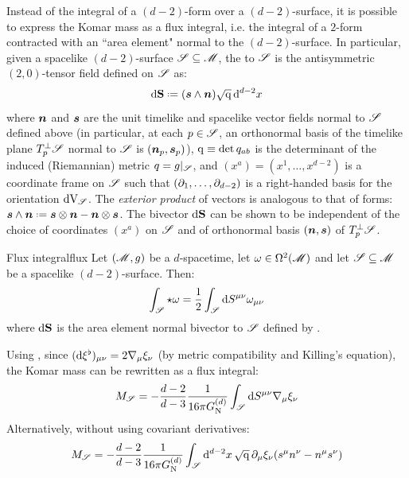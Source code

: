Instead of the integral of a $ (d-2) $-form over a $ (d-2) $-surface, it is possible to express the Komar mass as a flux integral, i.e. the integral of a $ 2 $-form contracted with an ``area element" normal to the $ (d-2) $-surface. In particular, given a spacelike $ (d-2) $-surface $ \mathscr{S} \subseteq \mathscr{M} $, the  to $ \mathscr{S} $ is the antisymmetric $ (2,0) $-tensor field defined on $ \mathscr{S} $ as:
\begin{equation}
  \dd \ve{S} \defeq (\ssb \wedge \nb) \sqrt{\mt{q}} \, \dd^{d-2} x
  \label{eq:area-element}
\end{equation}
where $ \boldsymbol{n} $ and $ \boldsymbol{s} $ are the unit timelike and spacelike vector fields normal to $ \mathscr{S} $ defined above (in particular, at each $ p \in \mathscr{S} $, an orthonormal basis of the timelike plane $ T_p^\perp \mathscr{S} $ normal to $ \mathscr{S} $ is $ (\boldsymbol{n}_p , \boldsymbol{s}_p) $), $ \mathrm{q} \equiv \det q_{ab} $ is the determinant of the induced (Riemannian) metric $ q = g \vert_\mathscr{S} $, and $ (x^a) = (x^1 , \dots , x^{d-2}) $ is a coordinate frame on $ \mathscr{S} $ such that $ (\partial_1 , \dots , \partial_{d-2}) $ is a right-handed basis for the orientation $ \mathrm{d} \mathrm{V}_\mathscr{S} $. The \emph{exterior product} of vectors is analogous to that of forms: $ \ssb \wedge \nb \defeq \ssb \otimes \nb - \nb \otimes \ssb $. The bivector $ \mathrm{d} \mathbf{S} $ can be shown to be independent of the choice of coordinates $ (x^a) $ on $ \mathscr{S} $ and of orthonormal basis $ (\boldsymbol{n} , \boldsymbol{s}) $ of $ T_p^\perp \mathscr{S} $.

\begin{lemma}{Flux integral}{flux}
  Let $ (\mathscr{M} , g) $ be a $ d $-spacetime, let $ \omega \in \Omega^{2}(\mathscr{M}) $ and let $ \mathscr{S} \subseteq \mathscr{M} $ be a spacelike $ (d-2) $-surface. Then:
  \begin{equation}
    \int_\mathscr{S} \star \omega = \frac{1}{2} \int_\mathscr{S} \mathrm{d} S^{\mu \nu} \omega_{\mu \nu}
    \label{eq:flux}
  \end{equation}
  where $ \mathrm{d} \mathbf{S} $ is the area element normal bivector to $ \mathscr{S} $ defined by .
\end{lemma}

Using , since $ (\mathrm{d} \xi^\flat)_{\mu \nu} = 2 \nabla_\mu \xi_\nu $ (by metric compatibility and Killing's equation), the Komar mass can be rewritten as a flux integral:
\begin{equation}
  M_\mathscr{S} = - \frac{d-2}{d-3} \frac{1}{16 \pi G_\text{N}^{(d)}} \int_\mathscr{S} \mathrm{d} S^{\mu \nu} \nabla_\mu \xi_\nu
  \label{eq:komar-mass-flux}
\end{equation}
Alternatively, without using covariant derivatives:
\begin{equation}
  M_\mathscr{S} = - \frac{d-2}{d-3} \frac{1}{16 \pi G_\text{N}^{(d)}} \int_\mathscr{S} \mathrm{d}^{d-2} x \, \sqrt{\mathrm{q}} \, \partial_\mu \xi_\nu (s^\mu n^\nu - n^\mu s^\nu)
  \label{eq:komar-mass-flux-alt}
\end{equation}

